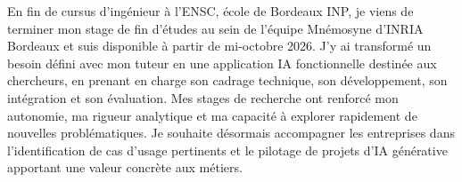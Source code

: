 
\begin{cvparagraph}
En fin de cursus d’ingénieur à l’ENSC, école de Bordeaux INP, je viens de terminer mon stage de fin d’études au sein de l’équipe Mnémosyne d’INRIA Bordeaux et suis disponible à partir de mi-octobre 2026. J’y ai transformé un besoin défini avec mon tuteur en une application IA fonctionnelle destinée aux chercheurs, en prenant en charge son cadrage technique, son développement, son intégration et son évaluation. Mes stages de recherche ont renforcé mon autonomie, ma rigueur analytique et ma capacité à explorer rapidement de nouvelles problématiques. Je souhaite désormais accompagner les entreprises dans l’identification de cas d’usage pertinents et le pilotage de projets d’IA générative apportant une valeur concrète aux métiers.
\end{cvparagraph}
